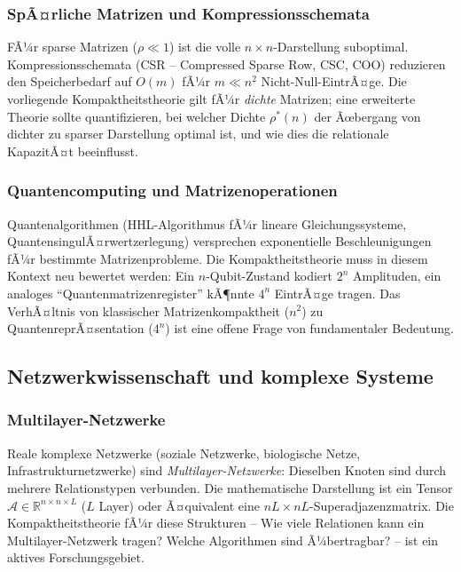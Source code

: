 ﻿\documentclass[12pt, a4paper]{article}
\theoremstyle{definition}
\theoremstyle{remark}
\newcommand{\R}{\mathbb{R}}
\begin{document}
\subsubsection*{SpÃ¤rliche Matrizen und Kompressionsschemata}

FÃ¼r sparse Matrizen ($\rho \ll 1$) ist die volle $n \times n$-Darstellung
suboptimal. Kompressionsschemata (CSR -- Compressed Sparse Row, CSC, COO)
reduzieren den Speicherbedarf auf $O(m)$ fÃ¼r $m \ll n^2$ Nicht-Null-EintrÃ¤ge.
Die vorliegende Kompaktheitstheorie gilt fÃ¼r \emph{dichte} Matrizen; eine
erweiterte Theorie sollte quantifizieren, bei welcher Dichte $\rho^*(n)$
der Ãœbergang von dichter zu sparser Darstellung optimal ist, und wie
dies die relationale KapazitÃ¤t beeinflusst.

\subsubsection*{Quantencomputing und Matrizenoperationen}

Quantenalgorithmen (HHL-Algorithmus fÃ¼r lineare Gleichungssysteme,
QuantensingulÃ¤rwertzerlegung) versprechen exponentielle Beschleunigungen
fÃ¼r bestimmte Matrizenprobleme. Die Kompaktheitstheorie muss in diesem
Kontext neu bewertet werden: Ein $n$-Qubit-Zustand kodiert $2^n$
Amplituden, ein analoges ``Quantenmatrizenregister'' kÃ¶nnte $4^n$
EintrÃ¤ge tragen. Das VerhÃ¤ltnis von klassischer Matrizenkompaktheit
($n^2$) zu QuantenreprÃ¤sentation ($4^n$) ist eine offene Frage von
fundamentaler Bedeutung.

\subsection{Netzwerkwissenschaft und komplexe Systeme}
\label{subsec:netzwerk}

\subsubsection*{Multilayer-Netzwerke}

Reale komplexe Netzwerke (soziale Netzwerke, biologische Netze,
Infrastrukturnetzwerke) sind \emph{Multilayer-Netzwerke}: Dieselben
Knoten sind durch mehrere Relationstypen verbunden. Die mathematische
Darstellung ist ein Tensor $\mathcal{A} \in \R^{n \times n \times L}$
($L$ Layer) oder Ã¤quivalent eine $nL \times nL$-Superadjazenzmatrix.
Die Kompaktheitstheorie fÃ¼r diese Strukturen -- Wie viele Relationen
kann ein Multilayer-Netzwerk tragen? Welche Algorithmen sind Ã¼bertragbar?
-- ist ein aktives Forschungsgebiet.
\end{document}
